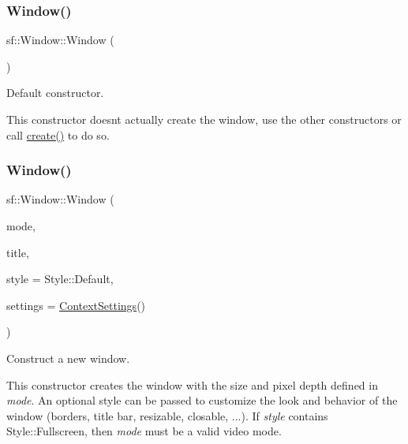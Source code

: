 \subsubsection{\texorpdfstring{Window()}{Window()}\hspace{0.1cm}{\footnotesize\ttfamily [1/3]}}
{\footnotesize\ttfamily sf\+::\+Window\+::\+Window (\begin{DoxyParamCaption}{ }\end{DoxyParamCaption})}



Default constructor. 

This constructor doesn\textquotesingle{}t actually create the window, use the other constructors or call \mbox{\hyperlink{classsf_1_1_window_a30e6edf2162f8dbff61023b9de5d961d}{create()}} to do so. \begin{DoxyVerb}\end{DoxyVerb}
 \mbox{\label{classsf_1_1_window_a1bee771baecbae6d357871929dc042a2}} 
\subsubsection{\texorpdfstring{Window()}{Window()}\hspace{0.1cm}{\footnotesize\ttfamily [2/3]}}
{\footnotesize\ttfamily sf\+::\+Window\+::\+Window (\begin{DoxyParamCaption}\item[{\mbox{\hyperlink{classsf_1_1_video_mode}{Video\+Mode}}}]{mode,  }\item[{const \mbox{\hyperlink{classsf_1_1_string}{String}} \&}]{title,  }\item[{Uint32}]{style = {\ttfamily Style\+:\+:Default},  }\item[{const \mbox{\hyperlink{structsf_1_1_context_settings}{Context\+Settings}} \&}]{settings = {\ttfamily \mbox{\hyperlink{structsf_1_1_context_settings}{Context\+Settings}}()} }\end{DoxyParamCaption})}



Construct a new window. 

This constructor creates the window with the size and pixel depth defined in {\itshape mode}. An optional style can be passed to customize the look and behavior of the window (borders, title bar, resizable, closable, ...). If {\itshape style} contains Style\+::\+Fullscreen, then {\itshape mode} must be a valid video mode.

